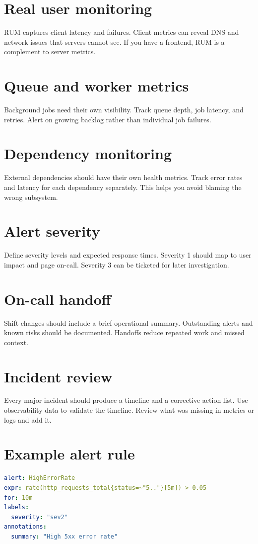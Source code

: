 \section{Real user monitoring}
RUM captures client latency and failures.
Client metrics can reveal DNS and network issues that servers cannot see.
If you have a frontend, RUM is a complement to server metrics.

\section{Queue and worker metrics}
Background jobs need their own visibility.
Track queue depth, job latency, and retries.
Alert on growing backlog rather than individual job failures.

\section{Dependency monitoring}
External dependencies should have their own health metrics.
Track error rates and latency for each dependency separately.
This helps you avoid blaming the wrong subsystem.

\section{Alert severity}
Define severity levels and expected response times.
Severity 1 should map to user impact and page on-call.
Severity 3 can be ticketed for later investigation.

\section{On-call handoff}
Shift changes should include a brief operational summary.
Outstanding alerts and known risks should be documented.
Handoffs reduce repeated work and missed context.

\section{Incident review}
Every major incident should produce a timeline and a corrective action list.
Use observability data to validate the timeline.
Review what was missing in metrics or logs and add it.

\section{Example alert rule}
\begin{lstlisting}[language=YAML]
alert: HighErrorRate
expr: rate(http_requests_total{status=~"5.."}[5m]) > 0.05
for: 10m
labels:
  severity: "sev2"
annotations:
  summary: "High 5xx error rate"
\end{lstlisting}

